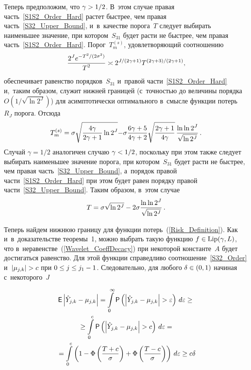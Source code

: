 \begin{multicols}{2}
Теперь предположим, что $\gamma\hm>1/2$. В~этом случае правая часть~\eqref{S1S2_Order_Hard} 
растет быст\-рее, чем правая часть~\eqref{S32_Upper_Bound}, и~в~качестве порога~$T$ 
следует выбирать наименьшее значение, при котором~$S_{31}$ будет рас\-ти не быст\-рее, 
чем правая часть~\eqref{S1S2_Order_Hard}. Порог~$T_m^{(s)}$, удовле\-тво\-ря\-ющий соотношению
\begin{equation*}
\displaystyle\frac{\displaystyle 2^{J}e^{-{T^2}/({2\sigma^2})}\mathstrut}{\displaystyle T^2\mathstrut} \asymp 2^{J/({2\gamma+1})}T^{(2\gamma+3)/(2\gamma+1)},
\end{equation*}
обеспечивает равенство порядков~$S_{31}$ и~правой час\-ти~\eqref{S1S2_Order_Hard} 
и,~таким образом, служит нижней границей (с~точ\-ностью до величины порядка $O(1/\sqrt{\ln 2^J})$) 
для асимп\-то\-ти\-че\-ски оптимального в~смыс\-ле функ\-ции потерь~$R_J$ порога. Отсюда
$$
T_m^{(s)}= \sigma\sqrt{\displaystyle\frac{\displaystyle 4\gamma\mathstrut}{\displaystyle 2\gamma+1\mathstrut}\ln2^J}
{-\sigma\displaystyle\frac{\displaystyle 6\gamma+5\mathstrut}{\displaystyle 4\gamma+2\mathstrut}
\sqrt{\displaystyle\frac{\displaystyle 2\gamma+1\mathstrut}{\displaystyle 4\gamma\mathstrut}}}\,\displaystyle\frac{\displaystyle \ln\ln2^J\mathstrut}{\displaystyle \sqrt{\ln2^J}\mathstrut}\,.
$$
Случай $\gamma=1/2$ аналогичен случаю $\gamma\hm<1/2$, поскольку при этом так\-же следует 
выбирать наименьшее значение порога, при котором~$S_{31}$ будет рас\-ти не быст\-рее, 
чем правая часть~\eqref{S32_Upper_Bound}, а~порядок правой час\-ти~\eqref{S1S2_Order_Hard} 
при этом будет равен порядку правой час\-ти~\eqref{S32_Upper_Bound}. Таким образом, в~этом случае
$$
T =\sigma\sqrt{\ln2^J}-2\sigma\displaystyle\frac{\displaystyle \ln{\ln2^J}\mathstrut}{\displaystyle \sqrt{\ln2^J}\mathstrut}\,.
$$

Теперь найдем ниж\-нюю границу для функции потерь~(\ref{Risk_Definition}). Как и~в~доказательстве 
тео\-ре\-мы~1, можно выбрать такую функцию $f\hm\in\mathrm{Lip}(\gamma,L)$, что 
в~неравенстве~(\ref{Wavelet_CoeffDecacy}) при некоторой константе~$A$ будет 
достигаться равенство. Для этой функ\-ции справедливо соотношение~\eqref{S32_Order} 
и~$|\mu_{j,k}|\hm>c$ при $0\hm\le j\hm\le j_1\hm-1$. Следовательно, 
для любого $\delta\hm\in(0,1)$ начиная с~некоторого~$J$

\vspace*{-6pt}

\noindent
\begin{multline*}
\e\left|\hat{Y}_{j,k}-\mu_{j,k}\right|=
\int\limits_0^\infty\p\left(\left|\hat{Y}_{j,k}-\mu_{j,k}\right|>\varepsilon\right)\,d\varepsilon
\ge{}\\
{}\ge \int\limits_0^{c}\p\left(\left|\hat{Y}_{j,k}-\mu_{j,k}\right|>c\right)\,d\varepsilon={}
\\
{}= \int\limits_0^{c}\left(
1-\Phi\left(\fr{T+c}{\sigma}\right)+\Phi\left(\fr{T-c}{\sigma}\right)
\right)\,d\varepsilon
\ge c\delta
\end{multline*}


\end{multicols}
